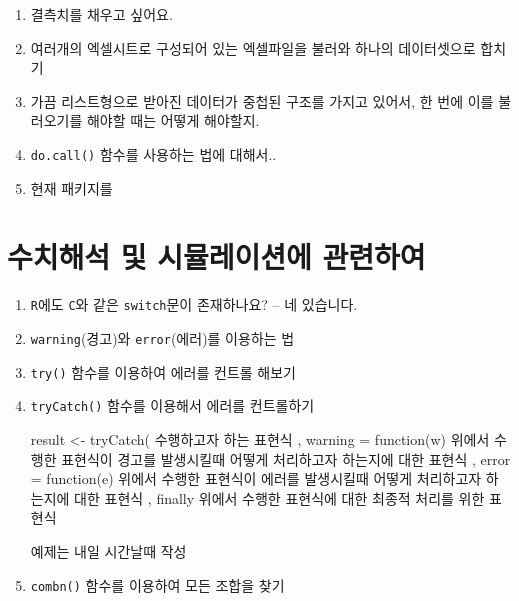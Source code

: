 
% 


\begin{enumerate}
\item 결측치를 채우고 싶어요.

\item 여러개의 엑셀시트로 구성되어 있는 엑셀파일을 불러와 하나의 데이터셋으로 합치기

\item 가끔 리스트형으로 받아진 데이터가 중첩된 구조를 가지고 있어서, 한 번에 이를 불러오기를 해야할 때는 어떻게 해야할지.

\item \texttt{do.call()} 함수를 사용하는 법에 대해서..

\item 현재 패키지를
\end{enumerate}

%
%

\section{수치해석 및 시뮬레이션에 관련하여}

\begin{enumerate}
\item \texttt{R}에도 \texttt{C}와 같은 \texttt{switch}문이 존재하나요?  -- 네 있습니다.

\item \texttt{warning}(경고)와 \texttt{error}(에러)를 이용하는 법

\item \texttt{try()} 함수를 이용하여 에러를 컨트롤 해보기

\item \texttt{tryCatch()} 함수를 이용해서 에러를 컨트롤하기

\begin{Schunk}
\begin{Soutput}
result <- tryCatch(
{
	수행하고자 하는 표현식
},
warning = function(w) {
	위에서 수행한 표현식이 경고를 발생시킬때 어떻게 처리하고자 하는지에 대한 표현식
},
error = function(e) {
	위에서 수행한 표현식이 에러를 발생시킬때 어떻게 처리하고자 하는지에 대한 표현식
}, finally {
	위에서 수행한 표현식에 대한 최종적 처리를 위한 표현식
}
\end{Soutput}
\end{Schunk}

예제는 내일 시간날때 작성
\item \texttt{combn()} 함수를 이용하여 모든 조합을 찾기
\end{enumerate}




